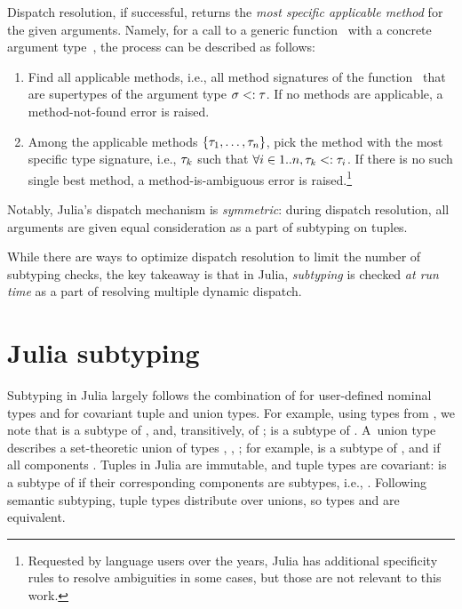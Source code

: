 Dispatch resolution, if successful, returns the \emph{most specific applicable
method} for the given arguments.
Namely, for a call to a generic function~ with a concrete argument
type~\gty, the process can be described as follows:
\begin{enumerate}
  \item Find all applicable methods, i.e., all method signatures \ty of the
    function~ that are supertypes of the argument type $\sigma <: \tau$.
    If no methods are applicable, a method-not-found error is raised.
  \item Among the applicable methods $\{\tau_1, \ldots, \tau_n\}$,
    pick the method with the most specific type signature,
    i.e., $\tau_k$ such that $\forall i\in1..n, \tau_k <: \tau_i$.
    If there is no such single best method, a method-is-ambiguous
    error is raised.\footnote{Requested by language users over the years,
    Julia has additional specificity rules to resolve ambiguities in some cases,
    but those are not relevant to this work.}
\end{enumerate}
Notably, Julia's dispatch mechanism is \emph{symmetric}:
during dispatch resolution, all arguments are given
equal consideration as a part of subtyping on tuples.

While there are ways to optimize dispatch resolution to limit the number of
subtyping checks, the key takeaway is that %
in Julia, \emph{subtyping} is checked \emph{at run time} as a part of
resolving multiple dynamic dispatch.

\section{Julia subtyping}\label{sec:2:subtyping}

Subtyping in Julia largely follows the combination of
 for user-defined nominal types and
 for covariant tuple and union types.
For example, using types from , we note that
 is a subtype of , and, transitively, of ;
 is a subtype of .
A~union type  describes a set-theoretic union of
types , , ; for example,  is a subtype of
, and  if all
components .
Tuples in Julia are immutable, and tuple types are covariant:
 is a subtype of  if
their corresponding components are subtypes, i.e., .
Following semantic subtyping, tuple types distribute over unions,
so types  and
 are equivalent.

